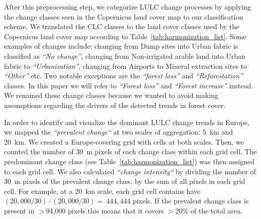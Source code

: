     After this preprocessing step, we categorize LULC change processes by applying the change classes seen in the Copernicus land cover map \citep{buchhorn2020copernicus} to our classification scheme. We translated the CLC classes to the land cover classes used by the Copernicus land cover map according to Table\@~\ref{tab:harmonization_list}. Some examples of changes include: changing from Dump sites into Urban fabric is classified as \emph{``No change''}, changing from Non-irrigated arable land into Urban fabric to \emph{``Urbanization''}, changing from Airports to Mineral extraction sites to \emph{``Other''} etc. 
    Two notable exceptions are the \emph{``forest loss''} and \emph{``Reforestation''} classes. In this paper we will refer to \emph{``Forest loss''} and \emph{``Forest increase''} instead. We renamed these change classes because we wanted to avoid making assumptions regarding the drivers of the detected trends in forest cover.
    
    In order to identify and visualize the dominant LULC change trends in Europe, we mapped the \emph{``prevalent change``} at two scales of aggregation: 5~km and 20~km. We created a Europe-covering grid with cells at both scales. Then, we counted the number of 30~m pixels of each change class within each grid cell. The predominant change class (see Table\@~\ref{tab:harmonization_list}) was then assigned to each grid cell. We also calculated \emph{``change intensity``} by dividing the number of 30~m pixels of the prevalent change class, by the sum of all pixels in each grid cell. For example, at a 20~km scale, each grid cell contains have $(20,000/30)\cdot (20,000/30) = ~444,444$ pixels. If the prevalent change class is present in $>$94,000 pixels this means that it covers $>$20\% of the total area. 
        
